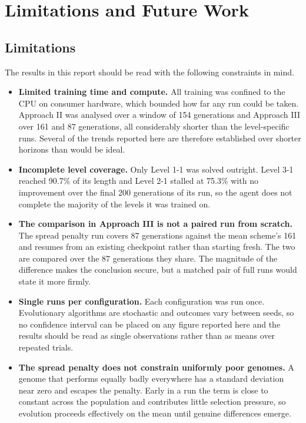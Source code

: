 \section{Limitations and Future Work}
\label{sec:limitations-future-work}

\subsection{Limitations}
\label{subsec:limitations}

The results in this report should be read with the following constraints in
mind.

\begin{itemize}
    \item \textbf{Limited training time and compute.} All training was confined
    to the CPU on consumer hardware, which bounded how far any run could be
    taken. Approach II was analysed over a window of 154 generations and
    Approach III over 161 and 87 generations, all considerably shorter than the
    level-specific runs. Several of the trends reported here are therefore
    established over shorter horizons than would be ideal.

    \item \textbf{Incomplete level coverage.} Only Level 1-1 was solved
    outright. Level 3-1 reached 90.7\% of its length and Level 2-1 stalled at
    75.3\% with no improvement over the final 200 generations of its run, so
    the agent does not complete the majority of the levels it was trained on.

    \item \textbf{The comparison in Approach III is not a paired run from
    scratch.} The spread penalty run covers 87 generations against the mean
    scheme's 161 and resumes from an existing checkpoint rather than starting
    fresh. The two are compared over the 87 generations they share. The
    magnitude of the difference makes the conclusion secure, but a matched pair
    of full runs would state it more firmly.

    \item \textbf{Single runs per configuration.} Each configuration was run
    once. Evolutionary algorithms are stochastic and outcomes vary between
    seeds, so no confidence interval can be placed on any figure reported here
    and the results should be read as single observations rather than as
    means over repeated trials.

    \item \textbf{The spread penalty does not constrain uniformly poor
    genomes.} A genome that performs equally badly everywhere has a standard
    deviation near zero and escapes the penalty. Early in a run the term is
    close to constant across the population and contributes little selection
    pressure, so evolution proceeds effectively on the mean until genuine
    differences emerge.


\end{itemize}
